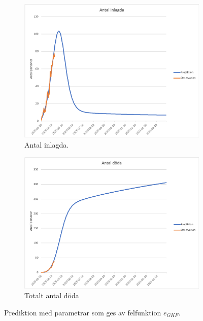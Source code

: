 \documentclass[a4paper, 12pt]{article}
\theoremstyle{definition}
\begin{document}
\begin{figure}[H]
\centering
\begin{subfigure}[b]{.49\textwidth}
\centering
\includegraphics[width=.9\hsize]{bilder/antal_inlagda_predikterat_20200417_gkf.png}
\caption{Antal inlagda.}
\end{subfigure}
\begin{subfigure}[b]{.49\textwidth}
\centering
\includegraphics[width=.9\hsize]{bilder/antal_doda_predikterat_20200417_gkf.png}
\caption{Totalt antal döda}
\end{subfigure}
\caption{Prediktion med parametrar som ges av felfunktion $e_{GKF}$.}
\end{figure}
\end{document}

